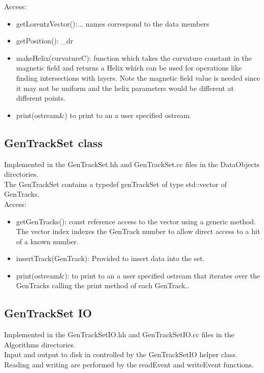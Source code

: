 \documentclass[aps,prd,superscriptaddress,floatfix]{revtex4}
\begin{document}
Access:
\begin{itemize}
\item getLorentzVector():... names correspond to the data members
\item getPosition(): \_dr

\item makeHelix(curvatureC): function which takes the curvature constant in the magnetic field and returns
a Helix which can be used for operations like finding intersections with layers.  Note the magnetic field
value is needed since it may not be uniform and the helix parameters would be different at different points.

\item print(ostream\&) to print to an a user specified ostream.
\end{itemize}


\subsection{GenTrackSet class}
Implemented in the GenTrackSet.hh and GenTrackSet.cc files in the DataObjects directories.
\\

The GenTrackSet contains a typedef genTrackSet of type std::vector of GenTracks.
\\
Access:

\begin{itemize}
\item getGenTracks(): const reference access to the vector using a generic method.
The vector index indexes the GenTrack number to allow direct access to a hit of a known number.

\item insertTrack(GenTrack): Provided to insert data into the set.

\item print(ostream\&): to print to an a user specified ostream that iterates over
the GenTracks calling the print method of each GenTrack..
\end{itemize}


\subsection{GenTrackSet IO}
Implemented in the GenTrackSetIO.hh and GenTrackSetIO.cc files in the Algorithms directories.
\\

Input and output to disk in controlled by the GenTrackSetIO helper class.  Reading and writing
are performed by the readEvent and writeEvent functions.
\\
\end{document}

